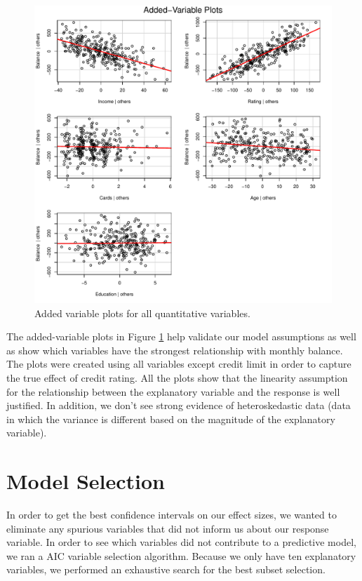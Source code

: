 \documentclass{article}
\begin{document}
\begin{figure}
\centering
\includegraphics[scale=.5]{AVPlot.pdf}
\caption{Added variable plots for all quantitative variables. }
\label{av}
\end{figure}

The added-variable plots in Figure \ref{av} help validate our model assumptions as well as show which variables have the strongest relationship with monthly balance. The plots were created using all variables except credit limit in order to capture the true effect of credit rating. All the plots show that the linearity assumption for the relationship between the explanatory variable and the response is well justified. In addition, we don't see strong evidence of heteroskedastic data (data in which the variance is different based on the magnitude of the explanatory variable).  
\section{Model Selection}
In order to get the best confidence intervals on our effect sizes, we wanted to eliminate any spurious variables that did not inform us about our response variable. In order to see which variables did not contribute to a predictive model, we ran a AIC variable selection algorithm. Because we only have ten explanatory variables, we performed an exhaustive search for the best subset selection. 
\end{document}
